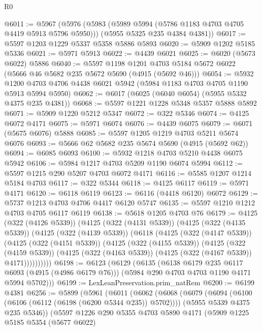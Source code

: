 \begin{lexlean}{R0}
\begin{coremodule}
@6011 := @5967
    (@5976
      (@5983 (@5989 @5994 (@5786 @1183 @4703 @4705 @4419 @5913 @5796 @5950)))
      (@5955 @5325 @235 @4384 @4381))
@6017 := @5597 @1203 @1229 @5337 @5358 @5886 @5893
@6020 := @5909 @1202 @5185 @5336
@6021 := @5971 @5913
@6022 := @4439 @6021
@6025 := @6020 (@5673 @6022) @5886
@6040 := @5597
    @1198
    @1201
    @4703
    @5184
    @5672
    @6022
    (@5666 @46 @5682 @235 @5672 @5690 (@4915 (@5692 @46)))
@6054 := @5932 @1200 @4703 @4706 @4438 @6021 @5942 (@5984 @1183 @4703 @4705 @1190 @5913 @5994 @5950)
@6062 := @6017 (@6025 (@6040 @6054) (@5955 @5332 @4375 @235 @4381))
@6068 := @5597 @1221 @1228 @5348 @5357 @5888 @5892
@6071 := @5909 @1220 @5212 @5347
@6072 := @322 @5346
@6074 := @4125 @6072 @4171
@6075 := @5971 @6074
@6076 := @4439 @6075
@6079 := @6071 (@5675 @6076) @5888
@6085 := @5597 @1205 @1219 @4703 @5211 @5674 @6076
@6093 := @5666 @62 @5682 @235 @5674 @5690 (@4915 (@5692 @62))
@6094 := @6085 @6093
@6100 := @5932 @1218 @4703 @5210 @4438 @6075 @5942
@6106 := @5984 @1217 @4703 @5209 @1190 @6074 @5994
@6112 := @5597 @1215 @290 @5207 @4703 @6072 @4171
@6116 := @5585 @1207 @1214 @5184 @4703
@6117 := @322 @5344
@6118 := @4125 @6117
@6119 := @5971 @4171
@6120 := @6118 @6119
@6123 := @6116 (@4418 @6120) @6072
@6129 := @5737 @1213 @4703 @4706 @4417 @6120 @5747
@6135 := @5597 @1210 @1212 @4703 @4705 @6117 @6119
@6138 := @5618 @1205 @4703 @76
@6179 := @4125
    (@322 (@4126 @5339))
    (@4125
      (@322 (@4131 @5339))
      (@4125
        (@322 (@4135 @5339))
        (@4125
          (@322 (@4139 @5339))
          (@6118
            (@4125
              (@322 (@4147 @5339))
              (@4125
                (@322 (@4151 @5339))
                (@4125
                  (@322 (@4155 @5339))
                  (@4125
                    (@322 (@4159 @5339))
                    (@4125 (@322 (@4163 @5339)) (@4125 (@322 (@4167 @5339)) @4171))))))))))
@6198 := @6123
    (@6129
      (@6135
        (@6138 @6179 @235 @6117 @6093 (@4915 (@4986 @6179 @76)))
        (@5984 @290 @4703 @4703 @1190 @4171 @5994 @5702)))
@6199 := LexLeanPreservation.prim_natRem
@6200 := @6199 @4381
@6256 := @5899
    (@5961
      (@6011
        (@6062
          (@6068
            (@6079
              (@6094 (@6100 (@6106 (@6112 (@6198 (@6200 @5344 @235)) @5702))))
              (@5955 @5339 @4375 @235 @5346))
            (@5597
              @1226
              @290
              @5355
              @4703
              @5890
              @4171
              (@5909
                @1225
                @5185
                @5354
                (@5677 @6022)

\end{coremodule}
\end{lexlean}
